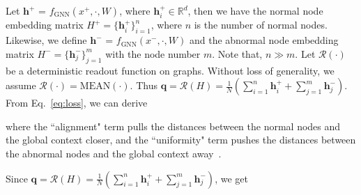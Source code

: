 

Let $\boldsymbol{h}^+$ = $f_{\text{GNN}}\left(x^+, \cdot, W\right)$, where $\boldsymbol{h}^+_i \in \mathbb{R}^d$, then we have the normal node embedding matrix $H^+ = \{\boldsymbol{h}^+_i\}_{i=1}^{n}$, where $n$ is the number of normal nodes. Likewise, we define $\boldsymbol{h}^-$ = $f_{\text{GNN}}\left(x^-, \cdot, W\right)$ and the abnormal node embedding matrix $H^- = \{\boldsymbol{h}^-_j\}_{j=1}^{m}$ with the node number $m$. Note that, $n\!\gg\! m$.
Let $\mathcal{R}(\cdot)$ be a deterministic readout function on graphs. Without loss of generality, we assume $\mathcal{R}(\cdot) = \text{MEAN}(\cdot)$. Thus $\boldsymbol{q} = \mathcal{R}(H) = \frac{1}{N}(\sum_{i=1}^{n}\boldsymbol{h}^+_i + \sum_{j=1}^{m}\boldsymbol{h}^-_j)$. 
From Eq.~\eqref{eq:loss}, we can derive

\begin{small}
\end{small}

\noindent where the ``alignment" term pulls the distances between the normal nodes and the  global context closer, and the ``uniformity" term pushes the distances between the abnormal nodes and the global context away~\cite{wang2020understanding}. 

Since $\boldsymbol{q} = \mathcal{R}(H) = \frac{1}{N}(\sum_{i=1}^{n}\boldsymbol{h}^+_i + \sum_{j=1}^{m}\boldsymbol{h}^-_j)$, we get
\begin{small}
\end{small}

